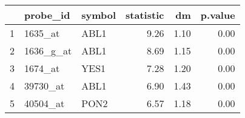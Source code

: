 \begin{table}[ht]
\begin{center}
\begin{tabular}{rllrrr}
  \hline
 & probe\_id & symbol & statistic & dm & p.value \\ 
  \hline
1 & 1635\_at & ABL1 & 9.26 & 1.10 & 0.00 \\ 
  2 & 1636\_g\_at & ABL1 & 8.69 & 1.15 & 0.00 \\ 
  3 & 1674\_at & YES1 & 7.28 & 1.20 & 0.00 \\ 
  4 & 39730\_at & ABL1 & 6.90 & 1.43 & 0.00 \\ 
  5 & 40504\_at & PON2 & 6.57 & 1.18 & 0.00 \\ 
   \hline
\end{tabular}
\end{center}
\end{table}
